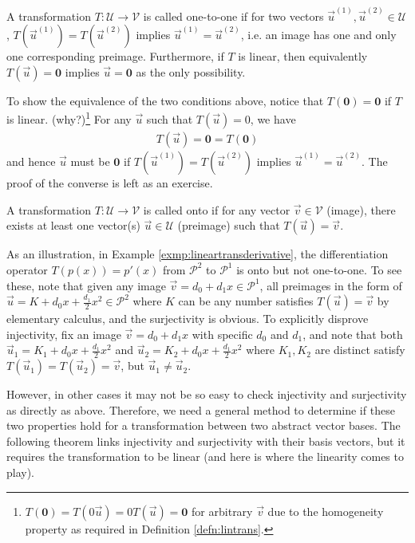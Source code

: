 \begin{proper}
\label{proper:injective}
A transformation $T: \mathcal{U} \to \mathcal{V}$ is called one-to-one if for two vectors $\vec{u}^{(1)}, \vec{u}^{(2)} \in \mathcal{U}$, $T(\vec{u}^{(1)}) = T(\vec{u}^{(2)})$ implies $\vec{u}^{(1)} = \vec{u}^{(2)}$, i.e. an image has one and only one corresponding preimage. Furthermore, if $T$ is linear, then equivalently $T(\vec{u}) = \textbf{0}$ implies $\vec{u} = \textbf{0}$ as the only possibility.
\end{proper}
To show the equivalence of the two conditions above, notice that $T(\textbf{0}) = \textbf{0}$ if $T$ is linear. (why?)\footnote{$T(\textbf{0})=T(0\vec{u})=0T(\vec{u})=\textbf{0}$ for arbitrary $\vec{v}$ due to the homogeneity property as required in Definition \ref{defn:lintrans}.} For any $\vec{u}$ such that $T(\vec{u}) = 0$, we have
\begin{align*}
T(\vec{u}) = \textbf{0} = T(\textbf{0})
\end{align*}
and hence $\vec{u}$ must be $\textbf{0}$ if $T(\vec{u}^{(1)}) = T(\vec{u}^{(2)})$ implies $\vec{u}^{(1)} = \vec{u}^{(2)}$. The proof of the converse is left as an exercise.
\begin{proper}
\label{proper:surjective}
A transformation $T: \mathcal{U} \to \mathcal{V}$ is called onto if for any vector $\vec{v} \in \mathcal{V}$ (image), there exists at least one vector(s) $\vec{u} \in \mathcal{U}$ (preimage) such that $T(\vec{u}) = \vec{v}$.
\end{proper}
As an illustration, in Example \ref{exmp:lineartransderivative}, the differentiation operator $T(p(x)) = p'(x)$ from $\mathcal{P}^2$ to $\mathcal{P}^1$ is onto but not one-to-one. To see these, note that given any image $\vec{v} = d_0 + d_1x \in \mathcal{P}^1$, all preimages in the form of $\vec{u} = K + d_0x + \frac{d_1}{2}x^2\in \mathcal{P}^2$ where $K$ can be any number satisfies $T(\vec{u}) = \vec{v}$ by elementary calculus, and the surjectivity is obvious. To explicitly disprove injectivity, fix an image $\vec{v} = d_0 + d_1x$ with specific $d_0$ and $d_1$, and note that both $\vec{u}_1 = K_1 + d_0x + \frac{d_1}{2}x^2$ and $\vec{u}_2 = K_2 + d_0x + \frac{d_1}{2}x^2$ where $K_1, K_2$ are distinct satisfy $T(\vec{u}_1) = T(\vec{u}_2) = \vec{v}$, but $\vec{u}_1 \neq \vec{u}_2$.

However, in other cases it may not be so easy to check injectivity and surjectivity as directly as above. Therefore, we need a general method to determine if these two properties hold for a transformation between two abstract vector bases. The following theorem links injectivity and surjectivity with their basis vectors, but it requires the transformation to be linear (and here is where the linearity comes to play).

